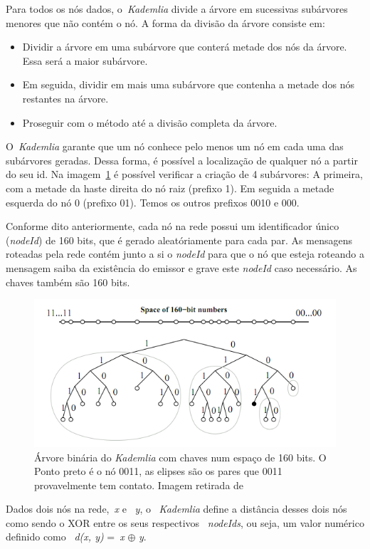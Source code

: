 Para todos os nós dados, o~\emph{Kademlia} divide a árvore em sucessivas subárvores menores que não contém o nó. A forma da divisão da árvore consiste em:
\begin{itemize}
	\item Dividir a árvore em uma subárvore que conterá metade dos nós da árvore. Essa será a maior subárvore.
	\item Em seguida, dividir em mais uma subárvore que contenha a metade dos nós restantes na árvore.
	\item Proseguir com o método até a divisão completa da árvore.
\end{itemize}
O~\emph{Kademlia} garante que um nó conhece pelo menos um nó em cada uma das subárvores geradas. Dessa forma, é possível a localização de qualquer nó a partir do seu id. Na imagem~\ref{fig:arvore-kademlia} é possível verificar a criação de 4 subárvores: A primeira, com a metade da haste direita do nó raiz (prefixo 1). Em seguida a metade esquerda do nó 0 (prefixo 01). Temos os outros prefixos 0010 e 000.

Conforme dito anteriormente, cada nó na rede possui um identificador único (\emph{nodeId}) de 160 bits, que é gerado aleatóriamente para cada par. As mensagens roteadas pela rede contém junto a si o \emph{nodeId} para que o nó que esteja roteando a mensagem saiba da existência do emissor e grave este \emph{nodeId} caso necessário. As chaves também são 160 bits.

\begin{figure}
	\centering
	\includegraphics[scale=0.5]{images/arvore-kademlia.png}
	\caption{Árvore binária do \emph{Kademlia} com chaves num espaço de 160 bits. O Ponto preto é o nó 0011, as elipses são os pares que 0011 provavelmente tem contato. Imagem retirada de~\cite{welzi11}}
	\label{fig:arvore-kademlia}
\end{figure}

Dados dois nós na rede,~\emph{x} e ~\emph{y}, o ~\emph{Kademlia} define a distância desses dois nós como sendo o XOR entre os seus respectivos ~\emph{nodeIds}, ou seja, um valor numérico definido como ~\emph{d(x, y)} =~\emph{x} $\oplus$ \emph{y}.

